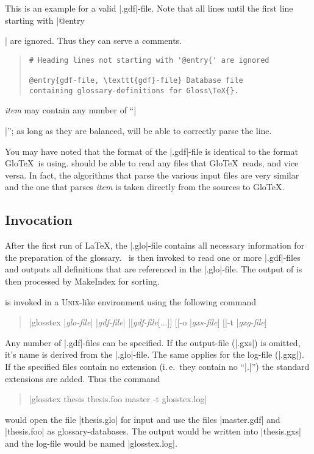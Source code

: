 \documentclass[draft,a4paper]{ltxdoc}
\newcommand{\unix}{{\scshape Unix}}
\newcommand{\MakeIndex}{{MakeIndex}}
\newcommand{\GloTeX}{Glo\TeX}
\newcommand{\darg}[1]{{\itshape #1\/}}
\newcommand{\dopt}[1]{$[$#1$]$}
\begin{document}
This is an example for a valid |.gdf|-file. Note that all lines
until the first line starting with |@entry{| are ignored. Thus they
can serve a comments.
%
\begin{quote}    
\begin{verbatim}
# Heading lines not starting with '@entry{' are ignored

@entry{gdf-file, \texttt{gdf}-file} Database file
containing glossary-definitions for Gloss\TeX{}.
\end{verbatim}
\end{quote}
%
\darg{item} may contain any number of ``|{|''; as long as they are
balanced, \GlossTeX{} will be able to correctly parse the line. 

You may have noted that the format of the |.gdf|-file is identical to
the format \GloTeX\ is using. \GlossTeX{} should be able to read any
files that \GloTeX\ reads, and vice versa. In fact, the algorithms
that parse the various input files are very similar and the one that
parses \darg{item} is taken directly from the sources to \GloTeX{}.

\subsection{Invocation}
After the first run of \LaTeX{}, the |.glo|-file contains all
necessary information for the preparation of the glossary. \GlossTeX\
is then invoked to read one or more |.gdf|-files and outputs all
definitions that are referenced in the |.glo|-file. The output of
\GlossTeX{} is then processed by \MakeIndex{}  for sorting.

\GlossTeX{} is invoked in a \unix{}-like environment using the
following command
%
\begin{quote}
  |glosstex |\darg{glo-file}| |\darg{gdf-file}| |\dopt{\darg{gdf-file}\dopt{...}} \dopt{|-o |\darg{gxs-file}} \dopt{|-t |\darg{gxg-file}}
\end{quote}

Any number of |.gdf|-files can be specified. If the output-file
(|.gxs|) is omitted, it's name is derived from
the |.glo|-file. The same applies for the log-file (|.gxg|). If the
specified files contain no extension (i.\,e.~they contain no ``|.|'')
the standard extensions are added. Thus the command
%
\begin{quote}
  |glosstex thesis thesis.foo master -t glosstex.log|
\end{quote}
%
would open the file |thesis.glo| for input and use the files
|master.gdf| and |thesis.foo| as glossary-databases. The output would
be written into |thesis.gxs| and the log-file would be named
|glosstex.log|.

}}
\end{document}

